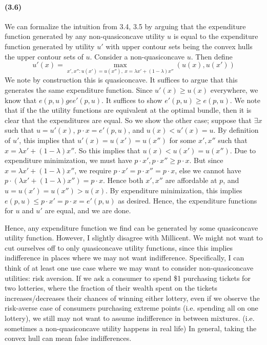 \documentclass[10pt,letter]{article}
\begin{document}
\paragraph{(3.6)}
We can formalize the intuition from 3.4, 3.5 by arguing that the expenditure function generated by any non-quasiconcave utility $u$ is equal to the expenditure function generated by utility $u'$ with upper contour sets being the convex hulls the upper contour sets of $u$. Consider a non-quasiconcave $u$. Then define \[ u'(x) = \max_{x', x'': u(x') = u(x''), \ x = \lambda x' + (1-\lambda)x''}(u(x), u(x')) \] We note by construction this is quasiconcave. It suffices to argue that this generates the same expenditure function. Since $u'(x) \ge u(x)$ everywhere, we know that $e(p, u) ge e'(p,u)$. It suffices to show $e'(p, u) \ge e(p,u)$. We note that if the the utility functions are equivalent at the optimal bundle, then it is clear that the expenditures are equal. So we show the other case; suppose that $\exists x$ such that $u = u'(x)$, $p\cdot x = e'(p,u)$, and $u(x) < u'(x) = u$. By definition of $u'$, this implies that $u'(x) = u(x') = u(x'')$ for some $x', x''$ such that $x = \lambda x' + (1-\lambda)x''$. So this implies that $u(x) < u(x') = u(x'')$. Due to expenditure minimization, we must have $p \cdot x', p\cdot x'' \ge p \cdot x$. But since $x = \lambda x' + (1-\lambda)x''$, we require $p \cdot x' = p\cdot x'' = p \cdot x$, else we cannot have $p \cdot (\lambda x' + (1-\lambda)x'') = p\cdot x$. Hence both $x', x''$ are affordable at $p$, and $u = u(x') = u(x'') > u(x)$. By expenditure minimization, this implies $e(p,u) \le p \cdot x' = p \cdot x = e'(p,u) $ as desired. Hence, the expenditure functions for $u$ and $u'$ are equal, and we are done.

Hence, any expenditure function we find can be generated by some quasiconcave utility function. However, I slightly disagree with Millicent. We might not want to cut ourselves off to only quasiconcave utility functions, since this implies indifference in places where we may not want indifference. Specifically, I can think of at least one use case where we may want to consider non-quasiconcave utilities: risk aversion. If we ask a consumer to spend \$1 purchasing tickets for two lotteries, where the fraction of their wealth spent on the tickets increases/decreases their chances of winning either lottery, even if we observe the risk-averse case of consumers purchasing extreme points (i.e. spending all on one lottery), we still may not want to assume indifference in between mixtures. (i.e. sometimes a non-quasiconcave utility happens in real life) In general, taking the convex hull can mean false indifferences.
\end{document}
